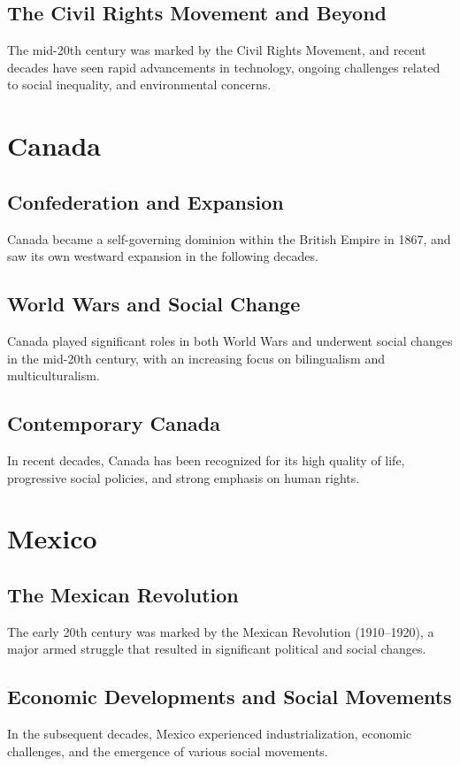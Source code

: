 \documentclass[a4paper,12pt]{book}
\begin{document}
\subsection{The Civil Rights Movement and Beyond}
The mid-20th century was marked by the Civil Rights Movement, and recent decades have seen rapid advancements in technology, ongoing challenges related to social inequality, and environmental concerns.

\section{Canada}
\label{sec:canada}

\subsection{Confederation and Expansion}
Canada became a self-governing dominion within the British Empire in 1867, and saw its own westward expansion in the following decades.

\subsection{World Wars and Social Change}
Canada played significant roles in both World Wars and underwent social changes in the mid-20th century, with an increasing focus on bilingualism and multiculturalism.

\subsection{Contemporary Canada}
In recent decades, Canada has been recognized for its high quality of life, progressive social policies, and strong emphasis on human rights.

\section{Mexico}
\label{sec:mexico}

\subsection{The Mexican Revolution}
The early 20th century was marked by the Mexican Revolution (1910–1920), a major armed struggle that resulted in significant political and social changes.

\subsection{Economic Developments and Social Movements}
In the subsequent decades, Mexico experienced industrialization, economic challenges, and the emergence of various social movements.
\end{document}
